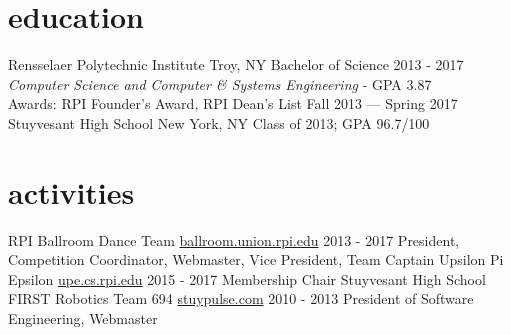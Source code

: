 \documentclass[]{friggeri-cv}
\begin{document}
\section{education}

\begin{entrylist}
  \entryheader
    {Rensselaer Polytechnic Institute}
    {Troy, NY}
  \entry
    {Bachelor of Science}
    {2013 - 2017}
    {\vspace{10pt}\emph{Computer Science and Computer \& Systems Engineering} - GPA 3.87\\
    Awards: RPI Founder's Award, RPI Dean's List Fall 2013 --- Spring 2017}
  \entryheader
    {Stuyvesant High School}
    {New York, NY}
  \entrynoheader
    {Class of 2013; GPA 96.7/100}
\end{entrylist}

\section{activities}

\begin{entrylist}
  \entryheader
    {RPI Ballroom Dance Team}
    {\href{https://ballroom.union.rpi.edu}{ballroom.union.rpi.edu} 2013 - 2017}
  \entrynoheader
    {President, Competition Coordinator, Webmaster, Vice President, Team Captain}
  \entryheader
    {Upsilon Pi Epsilon}
    {\href{https://upe.cs.rpi.edu}{upe.cs.rpi.edu} 2015 - 2017}
  \entrynoheader
    {Membership Chair}
  \entryheader
    {Stuyvesant High School FIRST Robotics Team 694}
    {\href{https://stuypulse.com}{stuypulse.com} 2010 - 2013}
  \entrynoheader
    {President of Software Engineering, Webmaster}
\end{entrylist}
\end{document}
